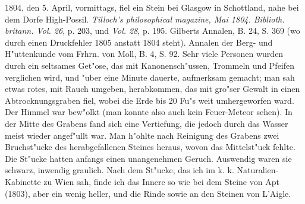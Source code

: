 \documentclass[a4paper, 11pt, oneside, polutonikogreek, german]{article}
\begin{document}
1804, den 5. April, vormittags, fiel ein Stein bei Glasgow in Schottland, nahe bei dem Dorfe High-Possil. \emph{Tilloch's philosophical magazine, Mai 1804. Biblioth. britann. Vol. 26}, p. 203, und \emph{Vol. 28}, p. 195. Gilberts Annalen, B. 24, S. 369 (wo durch einen Druckfehler 1805 anstatt 1804 steht). Annalen der Berg- und H"uttenkunde vom Frhrn. von Moll, B. 4, S. 92. Sehr viele Personen wurden durch ein seltsames Get"ose, das mit Kanonensch"ussen, Trommeln und Pfeifen verglichen wird, und "uber eine Minute dauerte, aufmerksam gemacht; man sah etwas rotes, mit Rauch umgeben, herabkommen, das mit gro"ser Gewalt in einen Abtrocknungsgraben fiel, wobei die Erde bis 20 Fu"s weit umhergeworfen ward. Der Himmel war bew"olkt (man konnte also auch kein Feuer-Meteor sehen). In der Mitte des Grabens fand sich eine Vertiefung, die jedoch durch das Wasser meist wieder angef"ullt war. Man h"ohlte nach Reinigung des Grabens zwei Bruchst"ucke des herabgefallenen Steines heraus, wovon das Mittelst"uck fehlte. Die St"ucke hatten anfangs einen unangenehmen Geruch. Auswendig waren sie schwarz, inwendig graulich. Nach dem St"ucke, das ich im k. k. Naturalien-Kabinette zu Wien sah, finde ich das Innere so wie bei dem Steine von Apt (1803), aber ein wenig heller, und die Rinde sowie an den Steinen von L'Aigle.
\end{document}
